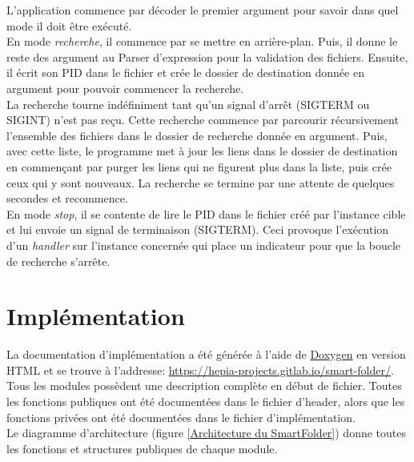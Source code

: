 \documentclass[11pt, a4paper]{article}
\begin{document}
L'application commence par décoder le premier argument pour savoir dans quel mode il doit être exécuté. \\

En mode \textit{recherche}, il commence par se mettre en arrière-plan.
Puis, il donne le reste des argument au Parser d'expression pour la validation des fichiers.
Ensuite, il écrit son PID dans le fichier et crée le dossier de destination donnée en argument pour pouvoir commencer la recherche. \\

La recherche tourne indéfiniment tant qu'un signal d'arrêt (SIGTERM ou SIGINT) n'est pas reçu.
Cette recherche commence par parcourir récursivement l'ensemble des fichiers dans le dossier de recherche donnée en argument.
Puis, avec cette liste, le programme met à jour les liens dans le dossier de destination en commençant par purger
les liens qui ne figurent plus dans la liste, puis crée ceux qui y sont nouveaux.
La recherche se termine par une attente de quelques secondes et recommence. \\

En mode \textit{stop}, il se contente de lire le PID dans le fichier créé par l'instance cible et
lui envoie un signal de terminaison (SIGTERM).
Ceci provoque l'exécution d'un \textit{handler} sur l'instance concernée qui place un indicateur
pour que la boucle de recherche s'arrête.

\newpage

\section{Implémentation}

La documentation d'implémentation a été générée à l'aide de \href{http://www.doxygen.org/index.html}{Doxygen} en version HTML et se trouve à l'addresse:
\url{https://hepia-projects.gitlab.io/smart-folder/}. \\

Tous les modules possèdent une description complète en début de fichier.
Toutes les fonctions publiques ont été documentées dans le fichier d'header,
alors que les fonctions privées ont été documentées dans le fichier d'implémentation. \\

Le diagramme d'architecture (figure \ref{Architecture du SmartFolder}) donne toutes les fonctions et structures publiques de chaque module. \\
\end{document}
